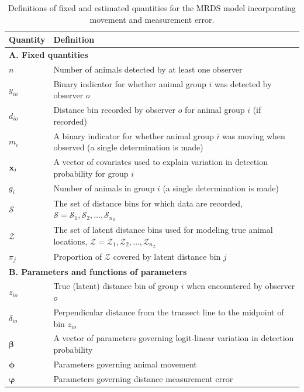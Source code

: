 \documentclass[12pt,fleqn]{article}
\begin{document}
\pagebreak
\begin{table}[ht]
\caption{Definitions of fixed and estimated quantities for the MRDS model incorporating movement and measurement error.
}
\label{tab:notation}
\raggedright
\begin{tabular}{p{2cm}p{13cm}}
  \hline
   Quantity & Definition \\
  \hline
   \multicolumn{2}{l}{\textbf{A. Fixed quantities}}   \\
  $n$ & Number of animals detected by at least one observer \\
  $y_{io}$ & Binary indicator for whether animal group $i$ was detected by observer $o$\\
  $d_{io}$ & Distance bin recorded by observer $o$ for animal group $i$ (if recorded) \\
  $m_{i}$ & A binary indicator for whether animal group $i$ was moving when observed (a single determination is made) \\
  ${\bf x}_i$ & A vector of covariates used to explain variation in detection probability for group $i$ \\
  $g_i$ & Number of animals in group $i$ (a single determination is made) \\
  $\mathcal{S}$ & The set of distance bins for which data are recorded, $\mathcal{S}=\mathcal{S}_1,\mathcal{S}_2,\hdots,\mathcal{S}_{n_\mathcal{S}}$ \\
  $\mathcal{Z}$ & The set of latent distance bins used for modeling true animal locations, $\mathcal{Z}=\mathcal{Z}_1,\mathcal{Z}_2,\hdots,\mathcal{Z}_{n_\mathcal{Z}}$
  \\
  $\pi_j$ & Proportion of $\mathcal{Z}$ covered by latent distance bin $j$ \\
  \multicolumn{2}{l}{\textbf{B. Parameters and functions of parameters}} \\
  $z_{io}$ & True (latent) distance bin of group $i$ when encountered by observer $o$ \\
  $\delta_{io}$ & Perpendicular distance from the transect line to the midpoint of bin $z_{io}$ \\
  $\boldsymbol{\beta}$ & A vector of parameters governing logit-linear variation in detection probability \\
  $\boldsymbol{\phi}$ & Parameters governing animal movement \\
  $\boldsymbol{\varphi}$ & Parameters governing distance measurement error \\

\end{tabular}
\end{table}
\end{document}
